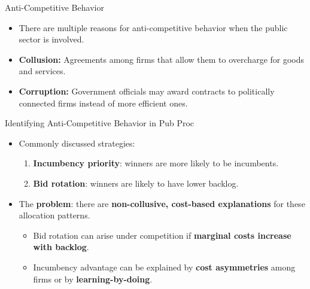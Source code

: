 \documentclass{beamer}
\begin{document}
\begin{frame}{Anti-Competitive Behavior}
  \begin{itemize}
    \item There are multiple reasons for anti-competitive behavior when the public sector is involved. \vspace{2mm}
    \item \textbf{Collusion:} Agreements among firms that allow them to overcharge for goods and services. \vspace{2mm}
    \item \textbf{Corruption:} Government officials may award contracts to politically connected firms instead of more efficient ones. \vspace{2mm}
  \end{itemize}
\end{frame}

\begin{frame}{Identifying Anti-Competitive Behavior in Pub Proc}
\begin{itemize}
  \item Commonly discussed strategies: \vspace{1mm}
  \begin{enumerate}
    \item \textbf{Incumbency priority}: winners are more likely to be incumbents.
    \item \textbf{Bid rotation}: winners are likely to have lower backlog.
  \end{enumerate} \pause
  \item The \textbf{problem}: there are \textbf{non-collusive, cost-based explanations} for these allocation patterns. \vspace{1mm}
  \begin{itemize}
    \item Bid rotation can arise under competition if \textbf{marginal costs increase with backlog}.
    \item Incumbency advantage can be explained by \textbf{cost asymmetries} among firms or by \textbf{learning-by-doing}.
  \end{itemize}
\end{itemize}
\end{frame}
\end{document}
